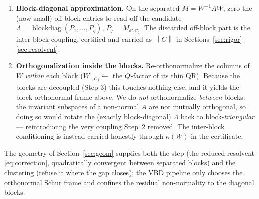\documentclass[11pt,a4paper]{article}
\newcommand{\norm}[1]{\left\|#1\right\|}
\newcommand{\abs}[1]{\left|#1\right|}
\theoremstyle{plain}
\theoremstyle{definition}
\begin{document}
\begin{enumerate}
    We warn against the variant --- which we used in an earlier draft of this pipeline ---
    that additionally \emph{merges} any column whose decoupling transform fails to
    contract, $\norm{X_{:,j}}_2\ge 1$. It has no basis in either reference; it appears to
    arise from reading Rump's Remark~2.3 (``the columns $\mu_i$ in $Z$, where
    $\abs{\mu_i}>1$ for a cluster'') as a column \emph{norm}, where $\abs{\mu_i}$ is the
    \emph{cardinality} of an index set. Because the test aggregates
    $\sum_i\abs{M_{ij}/(d_i-d_j)}$ over a whole column, on a strongly non-normal band
    (off-diagonals $O(1)$ over gaps $O(1)$) it fires on every column and collapses the
    whole spectrum into a single block even where the eigenvalues are plainly separable.
    The rigorous arbiter of clustering is the overlap of the certified discs
    (Section~\ref{sec:rigor}), applied \emph{after} certification, as in Miyajima's
    Algorithm~1 --- not a floating-point surrogate applied before it.
  \item \textbf{Block-diagonal approximation.} On the separated $M=W^{-1}AW$, zero the
    (now small) off-block entries to read off the candidate
    $\Lambda=\operatorname{blockdiag}(P_1,\dots,P_q)$, $P_j=M_{\mathcal C_j\mathcal C_j}$.
    The discarded off-block part is the inter-block coupling, certified and carried as
    $\norm C$ in Sections~\ref{sec:rigor}--\ref{sec:resolvent}.
  \item \textbf{Orthogonalization inside the blocks.} Re-orthonormalize the columns of
    $W$ \emph{within} each block ($W_{:,\mathcal C_j}\leftarrow$ the $Q$-factor of its thin
    QR). Because the blocks are decoupled (Step 3) this touches nothing else, and it yields
    the block-orthonormal frame above. We do \emph{not} orthonormalize \emph{between}
    blocks: the invariant subspaces of a non-normal $A$ are not mutually orthogonal, so
    doing so would rotate the (exactly block-diagonal) $\Lambda$ back to
    block-\emph{triangular} --- reintroducing the very coupling Step~2 removed. The inter-block
    conditioning is instead carried honestly through $\kappa(W)$ in the certificate.
\end{enumerate}
The geometry of Section~\ref{sec:geom} supplies both the step (the reduced resolvent
\eqref{eq:correction}, quadratically convergent between separated blocks) and the
clustering (refuse it where the gap closes); the VBD pipeline only chooses the orthonormal
Schur frame and confines the residual non-normality to the diagonal blocks.
\end{document}
